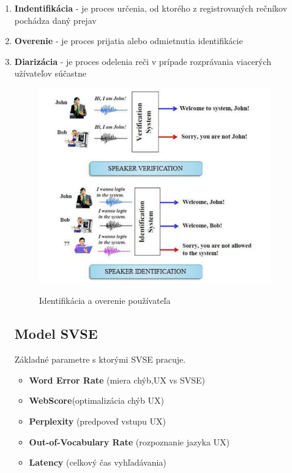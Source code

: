 \documentclass[10pt,slovak,a4paper]{article}
\begin{document}
\begin{enumerate}
    \item\textbf{Indentifikácia} - je proces určenia, od ktorého z registrovaných rečníkov pochádza daný prejav
    \item\textbf{Overenie} - je proces prijatia alebo odmietnutia identifikácie
       \item\textbf{Diarizácia} - je proces odelenia reči v prípade rozprávania viacerých užívateľov súčastne

  \begin{figure}[h]
    \centering
    \includegraphics[width=10cm]{speaker.png}
    \caption{Identifikácia a overenie používateľa}
    \cite{speakerrecognitionthesis}
  \end{figure}
\leavevmode \newline
\leavevmode \newline
\leavevmode \newline
\leavevmode \newline

\subsection{Model SVSE} \label{ina:este}
Základné parametre s ktorými SVSE pracuje.
\begin{itemize}
    \item\textbf{Word Error Rate} (miera chýb,UX vs SVSE) 
    \item\textbf{WebScore}(optimalizácia chýb UX)
    \item\textbf{Perplexity} (predpoveď vstupu UX)
    \item\textbf{Out-of-Vocabulary Rate} (rozpoznanie jazyka UX)
    \item\textbf{Latency} (celkový čas vyhľadávania)
\end{itemize}
\cite{schalkwyk2010your}


\end{enumerate}
\end{document}
